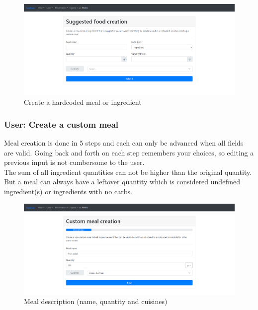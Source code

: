 \begin{figure}[H]
    \begin{center}
        \includegraphics[scale=0.4]{_figures/hardcoded-meal-creation.png}
        \caption{Create a hardcoded meal or ingredient}
    \end{center}
\end{figure}

\subsubsection{User: Create a custom meal}

Meal creation is done in 5 steps and each can only be advanced when all fields are valid.
Going back and forth on each step remembers your choices, so editing a previous input is not cumbersome to the user.\\

The sum of all ingredient quantities can not be higher than the original quantity. 
But a meal can always have a leftover quantity which is considered undefined ingredient(s) or ingredients with no carbs.\\

\begin{figure}[H]
    \begin{center}
        \includegraphics[scale=0.4]{_figures/custom-1.png}
        \caption{Meal description (name, quantity and cuisines)}
    \end{center}
\end{figure}

